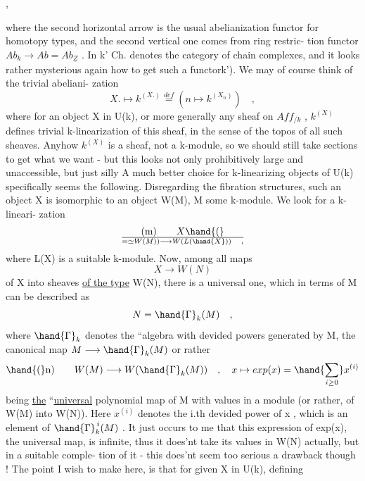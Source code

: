 
,

where the second horizontal arrow is the usual abelianization functor
for homotopy types,  and the second vertical one comes from ring restric-%
tion functor  $Ab_k \longrightarrow Ab = Ab_{\underline{Z}}$ .  In \hand{(}k'\hand{),} Ch.  denotes the category
of chain complexes,  and it looks rather mysterious again how to get
such a functor\hand{(}k').   We may of course think of the trivial abeliani-%
zation
\[ X. \mapsto k^{(X.)} \stackrel{def}{=} (n \mapsto k^{(X_n)} ) \quad , \]
where for an object X in U(k),  or more generally any sheaf on $Aff_{/k}$ ,
$k^{(X)}$ defines trivial k-linearization of this sheaf,  in the sense of the
topos of all such sheaves.  Anyhow $k^{(X)}$ is a sheaf,  not a k-module,
so we should still take sections to get what we want  -  but this  looks
not only prohibitively large and unaccessible,  but just silly\hand{!}  A much
better choice for k-linearizing objects of U(k) specifically seems the
following.  Disregarding the fibration structures,  such an object X is
isomorphic to an object W(M),  M some k-module.  We look for a k-lineari-%
zation
\[ \text{(m)} \qquad X \hand{(}\over{=}{\simeq}W(M)) \longrightarrow W(L(\hand{X})) \quad , \]
where L(X) is a suitable k-module.  Now,  among all maps
\[ X \longrightarrow W(N) \]
 of X into sheaves \uline{of the type} W(N),  there is a universal one,  which
in terms of M can be described as
\[ N = \hand{\Gamma}_k(M) \quad , \]
where $\hand{\Gamma}_k$  denotes the ``algebra with devided powers generated by M,
the canonical map  $M \longrightarrow \hand{\Gamma}_k(M)$  or rather
\[ \hand{(}\text{n}) \qquad W(M) \longrightarrow W(\hand{\Gamma}_k(M)) \quad , \quad x \mapsto exp(x) = \hand{\sum_{i\geq 0}} x^{(i)} \]
being \uline{the} ``\uline{universal} polynomial map  of M with values in a module 
(or rather,  of W(M) into W(N)).   Here  $x^{(i)}$ denotes the i.th devided
power of x ,  which is an element of  $\hand{\Gamma}_k^{\,i}(M)$ .  It just occurs to me
that this expression of exp(x),  the universal map,  is infinite,  thus
it does'nt take its values in W(N)  actually,  but in a suitable comple-%
tion of it - this does'nt seem too serious a drawback though !  The
point I wish to make here,  is that for given X in U(k),  defining

